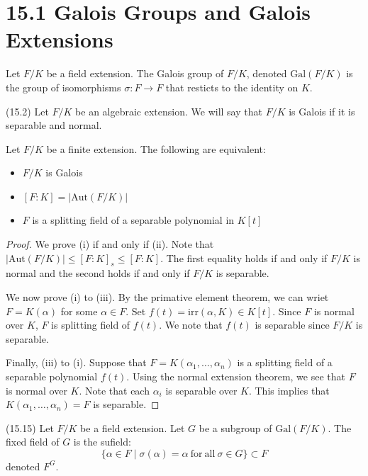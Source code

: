 \section{15.1 Galois Groups and Galois Extensions}
\begin{defi}
Let $F/K$ be a field extension. The Galois group of $F/K$, denoted $\mathrm{Gal}(F/K)$ is the group of isomorphisms $\sigma :F\rightarrow F$ that resticts to the identity on $K$.
\end{defi}
\vspace{2ex}
\begin{defi}
(15.2) Let $F/K$ be an algebraic extension. We will say that $F/K$ is Galois if it is separable and normal. 
\end{defi}
\vspace{2ex}
\begin{prop}
Let $F/K$ be a finite extension. The following are equivalent:
\begin{itemize}
\item[(i)] $F/K$ is Galois
\item[(ii)] $[F:K]=|\mathrm{Aut}(F/K)|$
\item[(iii)] $F$ is a splitting field of a separable polynomial in $K[t]$ 
\end{itemize}
\end{prop}
\vspace{2ex}
\begin{proof}
We prove (i) if and only if (ii). Note that $|\mathrm{Aut}(F/K)|\leq [F:K]_{s}\leq [F:K]$. The first equality holds if and only  if $F/K$ is normal and the second holds if and only if $F/K$ is separable.

\bigskip

We now prove (i) to (iii). By the primative element theorem, we can wriet $F=K(\alpha )$ for some $\alpha \in F$. Set $f(t)=\mathrm{irr}(\alpha ,K)\in K[t]$. Since $F$ is normal over $K$, $F$ is  splitting field of $f(t)$. We note that $f(t)$ is separable since $F/K$ is separable.

\bigskip

Finally, (iii) to (i). Suppose that $F=K(\alpha_1,\ldots ,\alpha _{n})$ is a splitting field of a separable polynomial $f(t)$. Using the normal extension theorem, we see that $F$ is normal over $K$. Note that each $\alpha _{i}$ is separable over $K$. This implies that $K(\alpha_1,\ldots ,\alpha _{n})=F$ is separable. 
\end{proof}
\vspace{2ex}
\begin{defi}
(15.15) Let $F/K$ be a field extension. Let $G$ be a subgroup of $\mathrm{Gal}(F/K)$. The fixed field of $G$ is the sufield: 
\[\{\alpha \in F\;|\;\sigma (\alpha )=\alpha \mathrm{\ for\ all\ } \sigma \in G \}\subset F\]
denoted $F^{G}$. 
\end{defi}
